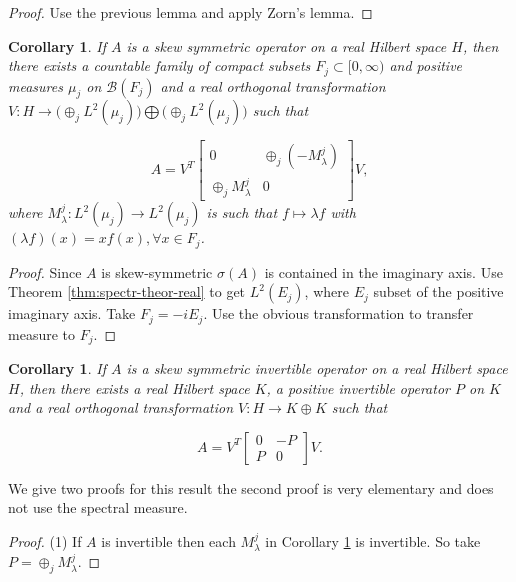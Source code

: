 \documentclass[12pt,a4paper,twoside]{article}
\numberwithin{equation}{section}
\theoremstyle{definition}  %
\theoremstyle{plain}  %
\newtheorem{cor}[defn]{Corollary}
\theoremstyle{remark} %
\begin{document}
\begin{proof}
  Use the previous lemma and apply Zorn's lemma.
\end{proof}

\begin{cor} \label{cor:skew}
 If $A$ is a skew symmetric operator on a real Hilbert space $H$, then there exists a countable family of compact subsets $F_j \subset [0, \infty)$ and positive measures $\mu_j$ on $\mathcal{B}(F_j)$ and a real orthogonal transformation $V \colon H \to \big(\oplus_{j}  L^{2}(\mu_{j}) \big) \bigoplus \big(\oplus_{j} L^{2}(\mu_{j}) \big) $ such that

  \begin{equation}
    \label{eq:skew}
    A = V^{T} \begin{bmatrix}
                          0            & \oplus_{j}(-M_{\lambda}^{j})   \\
              \oplus_{j}M_{\lambda}^{j} &        0
             \end{bmatrix} V,
  \end{equation}
where $M_{\lambda}^{j} \colon L^{2}(\mu_{j}) \to L^{2}(\mu_{j})$ is such that $f \mapsto \lambda f$ with $(\lambda f)(x)= xf(x), \forall x \in F_{j}$.
\end{cor}
\begin{proof}
Since $A$ is skew-symmetric $\sigma(A)$ is contained in the imaginary axis.  Use Theorem \ref{thm:spectr-theor-real} to get $L^{2}(E_{j})$, where $E_{j}$ subset of the positive imaginary axis. Take $F_{j} = -iE_{j}$. Use the obvious transformation to transfer measure to $F_{j}$.
\end{proof}
\begin{cor}\label{cor:invertible}
  If $A$ is a skew symmetric invertible operator on a real Hilbert space $H$, then there exists a real Hilbert space $K$, a positive invertible operator $P$ on $K$ and a real orthogonal transformation $V \colon H \to K \oplus K $ such that

  \begin{equation}
    \label{eq:skew}
    A = V^{T} \begin{bmatrix}
               0   & -P  \\
               P   & 0
             \end{bmatrix} V.
  \end{equation}
\end{cor}
We give two proofs for this result the second proof is very elementary and does not use the spectral measure.
\begin{proof}(1)
  If  $A$ is invertible then each $M_{\lambda}^j$ in Corollary \ref{cor:skew} is invertible. So take $P= \oplus_{j}M_{\lambda}^{j} . $
\end{proof}
\end{document}
